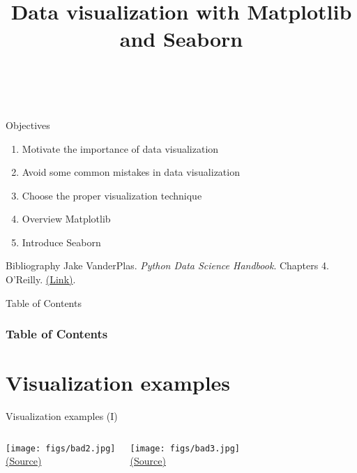 \documentclass[10pt,compress]{beamer} %
\title[Dataviz]{Data visualization with Matplotlib and Seaborn}
\author{\asignatura\\\carrera}
\institute{}
\date{}
\begin{document}
{\titlepageBlue
    \begin{frame}
        \titlepage
    \end{frame}
}

\institute{\asignatura}

\begin{frame}[plain]{}
	\begin{block}{Objectives}
		\begin{enumerate}
		\item Motivate the importance of data visualization
		\item Avoid some common mistakes in data visualization
		\item Choose the proper visualization technique
		\item Overview Matplotlib
		\item Introduce Seaborn
		\end{enumerate}
	\end{block}

   \begin{block}{Bibliography}
       Jake VanderPlas. \textit{Python Data Science Handbook}. Chapters 4. O'Reilly. \href{https://jakevdp.github.io/PythonDataScienceHandbook/}{(Link)}.
   \end{block}
\end{frame}

{
\begin{frame}[shrink]{Table of Contents}
 \frametitle{Table of Contents}
 \tableofcontents
\end{frame}
}

\section{Visualization examples}

\begin{frame}{Visualization examples (I)}
	\begin{columns}
		\centering \texttt{[image: figs/bad2.jpg]}\\
		\centering \tiny \href{http://livingqlikview.com/the-9-worst-data-visualizations-ever-created/}{(Source)}

		\centering \texttt{[image: figs/bad3.jpg]}\\
		\centering \tiny \href{http://livingqlikview.com/the-9-worst-data-visualizations-ever-created/}{(Source)}
	\end{columns}
\end{frame}
\end{document}
